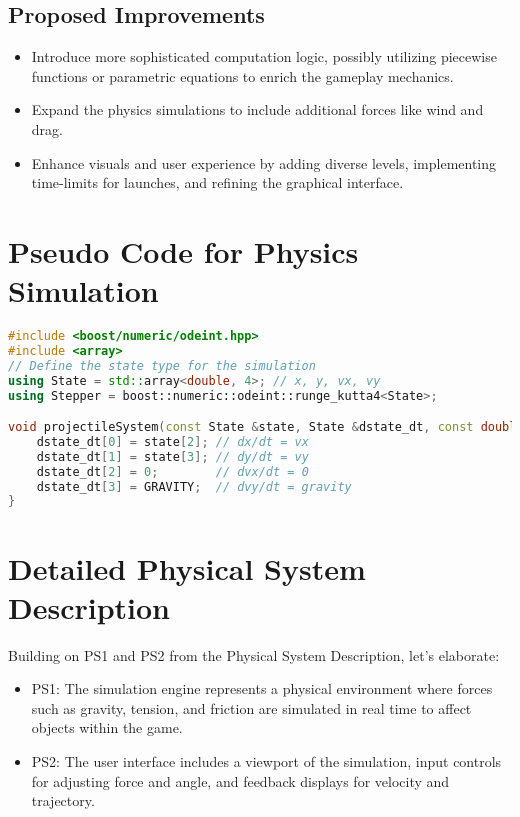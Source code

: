 \documentclass[12pt]{article}
\begin{document}
\subsection{Proposed Improvements}
\begin{itemize}
    \item Introduce more sophisticated computation logic, possibly utilizing piecewise functions or parametric equations to enrich the gameplay mechanics.
    \item Expand the physics simulations to include additional forces like wind and drag.
    \item Enhance visuals and user experience by adding diverse levels, implementing time-limits for launches, and refining the graphical interface.
\end{itemize}

\section{Pseudo Code for Physics Simulation}
\begin{lstlisting}[language=C++, caption={Physics System Simulation}, label={lst:physics_simulation}]
#include <boost/numeric/odeint.hpp>
#include <array>
// Define the state type for the simulation
using State = std::array<double, 4>; // x, y, vx, vy
using Stepper = boost::numeric::odeint::runge_kutta4<State>;

void projectileSystem(const State &state, State &dstate_dt, const double) {
    dstate_dt[0] = state[2]; // dx/dt = vx
    dstate_dt[1] = state[3]; // dy/dt = vy
    dstate_dt[2] = 0;        // dvx/dt = 0
    dstate_dt[3] = GRAVITY;  // dvy/dt = gravity
}
\end{lstlisting}

\section{Detailed Physical System Description}
Building on PS1 and PS2 from the Physical System Description, let's elaborate:

\begin{itemize}
    \item PS1: The simulation engine represents a physical environment where forces such as gravity, tension, and friction are simulated in real time to affect objects within the game.
    \item PS2: The user interface includes a viewport of the simulation, input controls for adjusting force and angle, and feedback displays for velocity and trajectory.
\end{itemize}
\end{document}
